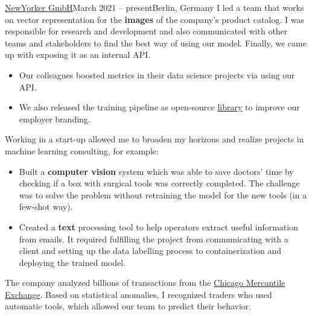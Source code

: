 
{\href{https://www.newyorker.de/}{NewYorker GmbH}}{March 2021 -- 
present}{Berlin, Germany}
I led a team that works on vector representation for the \textbf{images} 
of the company's product catalog.
I was responsible for research and development and also
communicated with other teams and stakeholders to find the best way of 
using our model.
Finally, we came up with exposing it as an internal API. 
\begin{itemize}
\item Our colleagues boosted metrics in their data science projects via 
using our API. 
\item We also released the training pipeline as open-source 
\href{https://github.com/OML-Team/open-metric-learning}{\underline{library}} 
to improve our employer branding. 
\end{itemize}

\divider

Working in a start-up allowed me to broaden my horizons and realize 
projects in machine learning consulting, for example:
\begin{itemize}
\item Built a \textbf{computer vision} system which was able to save 
doctors' time by checking if a box with surgical tools was correctly 
completed. The challenge was to solve the problem without retraining the 
model for the new tools (in a few-shot way).
\item Created a \textbf{text} processing tool to help operators extract 
useful information from emails. It required fulfilling the project from 
communicating with a client and setting up the data labelling process to 
containerization and deploying the trained model.
\end{itemize}

\divider

The company analyzed billions of transactions from the 
\href{https://en.wikipedia.org/wiki/Chicago_Mercantile_Exchange}
{Chicago Mercantile Exchange}.
Based on statistical anomalies, I recognized traders who used automatic 
tools, which allowed our team to predict their behavior.
\smallskip
\smallskip

